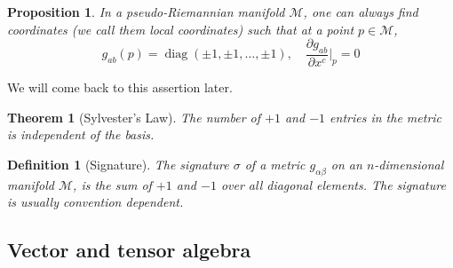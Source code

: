 \documentclass[a4paper]{article}
\DeclareMathOperator{\diag}{diag}
\theoremstyle{new}
\newtheorem{defi}{Definition}[section]
\newtheorem{thm}{Theorem}[section]
\newtheorem{prop}{Proposition}[section]
\begin{document}
\begin{prop}\label{localcoordprop2}
In a pseudo-Riemannian manifold $\mathcal{M}$, one can always find coordinates (we call them local coordinates) such that at a point $p\in\mathcal{M}$,
$$g_{ab}(p)=\diag(\pm1,\pm1,\dots,\pm1),\quad\frac{\partial g_{ab}}{\partial x^c}\bigg|_p=0$$
\end{prop}
We will come back to this assertion later.
\begin{thm}[Sylvester's Law]
The number of $+1$ and $-1$ entries in the metric is independent of the basis.
\end{thm}
\begin{defi}[Signature]
The signature $\sigma$ of a metric $g_{\alpha\beta}$ on an $n$-dimensional manifold $\mathcal{M}$, is the sum of $+1$ and $-1$ over all diagonal elements. The signature is usually convention dependent.
\end{defi}
\newpage
\subsection{Vector and tensor algebra}
\end{document}
